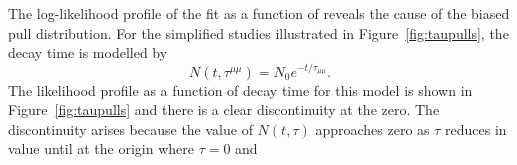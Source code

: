 {%

The log-likelihood profile of the  fit as a function of \tmumu reveals the cause of the biased pull distribution. For the simplified studies illustrated in Figure~\ref{fig:taupulls}, the decay time is modelled by
\begin{equation}
N(t, \tau^{\mu \mu}) = N_{0}e^{-t/\tau_{\mu\mu}}.
\end{equation}
The likelihood profile as a function of decay time for this model is shown in Figure~\ref{fig:taupulls} and there is a clear discontinuity at the zero. The discontinuity arises because the value of $N(t, \tau)$ approaches zero as $\tau$ reduces in value until at the origin where $\tau = 0$ and 


}
